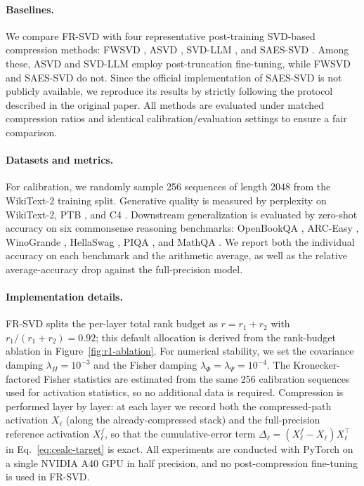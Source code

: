 \documentclass[a4paper,fleqn]{cas-dc}
\begin{document}
\paragraph{Baselines.}
We compare FR-SVD with four representative post-training SVD-based compression methods: FWSVD \citep{hsu2022fwsvd}, ASVD \citep{yuan2023asvd}, SVD-LLM \citep{wang2025svdllm}, and SAES-SVD \citep{saessvd2025}. Among these, ASVD and SVD-LLM employ post-truncation fine-tuning, while FWSVD and SAES-SVD do not. Since the official implementation of SAES-SVD is not publicly available, we reproduce its results by strictly following the protocol described in the original paper. All methods are evaluated under matched compression ratios and identical calibration/evaluation settings to ensure a fair comparison.

\paragraph{Datasets and metrics.}
For calibration, we randomly sample 256 sequences of length 2048 from the WikiText-2 \citep{merity2017wikitext2} training split. Generative quality is measured by perplexity on WikiText-2, PTB \citep{marcus1993ptb}, and C4 \citep{raffel2020c4}. Downstream generalization is evaluated by zero-shot accuracy on six commonsense reasoning benchmarks: OpenBookQA \citep{mihaylov2018openbook}, ARC-Easy \citep{clark2018think}, WinoGrande \citep{sakaguchi2021winogrande}, HellaSwag \citep{zellers2019hellaswag}, PIQA \citep{bisk2020piqa}, and MathQA \citep{amini2019mathqa}. We report both the individual accuracy on each benchmark and the arithmetic average, as well as the relative average-accuracy drop against the full-precision model.

\paragraph{Implementation details.}
FR-SVD splits the per-layer total rank budget as $r = r_1 + r_2$ with $r_1/(r_1+r_2)=0.92$; this default allocation is derived from the rank-budget ablation in Figure~\ref{fig:r1-ablation}. For numerical stability, we set the covariance damping $\lambda_H = 10^{-3}$ and the Fisher damping $\lambda_\Phi = \lambda_\Psi = 10^{-4}$. The Kronecker-factored Fisher statistics are estimated from the same 256 calibration sequences used for activation statistics, so no additional data is required. Compression is performed layer by layer: at each layer we record both the compressed-path activation $X_\ell$ (along the already-compressed stack) and the full-precision reference activation $X_\ell^f$, so that the cumulative-error term $\Delta_\ell=(X_\ell^f - X_\ell)X_\ell^\top$ in Eq.~\eqref{eq:cealc-target} is exact. All experiments are conducted with PyTorch on a single NVIDIA A40 GPU in half precision, and no post-compression fine-tuning is used in FR-SVD.
\end{document}
